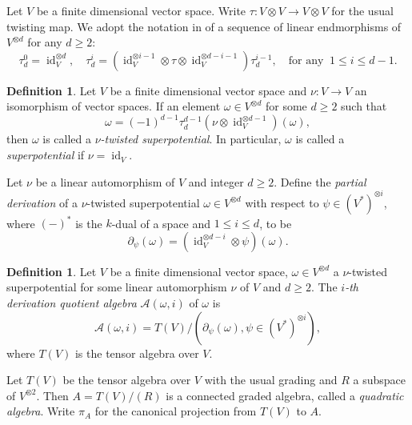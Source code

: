 \documentclass[a4paper,10pt]{amsart}
\newtheorem{lemma}[theorem]{Lemma}
\theoremstyle{definition}
\newtheorem{definition}[theorem]{Definition}
\numberwithin{equation}{section}
\DeclareMathOperator{\id}{id}
\begin{document}

Let $V$ be a finite dimensional vector space. Write $\tau:V\otimes V\to V\otimes V$ for the usual twisting map. We adopt the notation in \cite{HVZ} of a sequence of linear endmorphisms of $V^{\otimes d}$ for any $d\geq 2$:
$$
\tau_{d}^0=\id_V^{\otimes d},\quad %
\tau_d^{i}=(\id_V^{\otimes i-1}\otimes \tau\otimes\id_V^{\otimes d-i-1 })\tau_{d}^{i-1},\quad\text{for any }~ 1\leq i\leq d-1.
$$

\begin{definition}
Let $V$ be a finite dimensional vector space and $\nu:V\to V$ an isomorphism of vector spaces. If an element $\omega\in V^{\otimes d}$ for some $d\geq 2$ such that
$$
\omega=(-1)^{d-1}\tau_{d}^{d-1}(\nu\otimes\id_V^{\otimes d-1})(\omega),
$$
then $\omega$ is called a \emph{$\nu$-twisted superpotential}. In particular, $\omega$ is called a \emph{superpotential} if $\nu=\id_V$.
\end{definition}

Let $\nu$ be a linear automorphism of $V$ and integer $d\geq2$. Define the \emph{partial derivation} of a $\nu$-twisted superpotential $\omega\in V^{\otimes d}$ with respect to $\psi\in (V^*)^{\otimes i}$, where $(-)^*$ is the  $k$-dual of a space and $1\leq i\leq d$,  to be
$$
\partial_{\psi}(\omega)=(\id_V^{\otimes d-i}\otimes \psi)(\omega).
$$

\begin{definition}
Let $V$ be a finite dimensional vector space,  $\omega\in V^{\otimes d}$ a $\nu$-twisted superpotential for some linear automorphism $\nu$ of $V$ and $d\geq 2$. The \emph{$i$-th derivation quotient algebra} $\mathcal{A}(\omega,i)$ of $\omega$ is
$$
\mathcal{A}(\omega,i)=T(V)/(\partial_{\psi}(\omega),\psi\in (V^*)^{\otimes i}),
$$
where $T(V)$ is the tensor algebra over $V$.
\end{definition}

Let $T(V)$  be the tensor algebra over $V$ with the usual grading and $R$ a subspace of $V^{\otimes 2}$. Then $A=T(V)/(R)$ is a connected graded algebra, called a \emph{quadratic algebra}. Write $\pi_A$ for the canonical projection from $T(V)$ to $A$.
\end{document}
